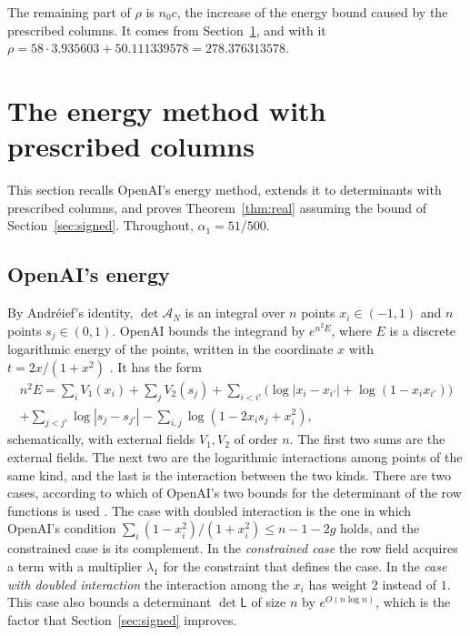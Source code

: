 \documentclass[11pt]{amsart}
\newcommand{\Rho}{278.376313578}
\newcommand{\Cost}{3.935603}
\newcommand{\Psiw}{50.111339578}
\newcommand{\AlphaOne}{51/500}
\theoremstyle{definition}
\theoremstyle{remark}
\numberwithin{equation}{section}
\newcommand{\cA}{\mathcal A}
\begin{document}
The remaining part of $\rho$ is $n_0c$, the increase of the energy bound caused by the prescribed
columns. It comes from Section~\ref{sec:energy}, and with it $\rho=58\cdot\Cost+\Psiw=\Rho$.
\section{The energy method with prescribed columns}\label{sec:energy}

This section recalls OpenAI's energy method, extends it to determinants with prescribed columns, and
proves Theorem~\ref{thm:real} assuming the bound of Section~\ref{sec:signed}. Throughout, $\alpha_1=\AlphaOne$.

\subsection{OpenAI's energy}\label{ssec:energy}
By Andr\'eief's identity, $\det\cA_N$ is an integral over $n$ points $x_i\in(-1,1)$ and $n$ points
$s_j\in(0,1)$. OpenAI bounds the integrand by $e^{n^2E}$, where $E$ is a discrete logarithmic energy of the
points, written in the coordinate $x$ with $t=2x/(1+x^2)$ \cite[\S5]{OpenAI2026}. It has the form
\begin{multline*}
 n^2E=\sum_iV_1(x_i)+\sum_jV_2(s_j)+\sum_{i<i'}\bigl(\log|x_i-x_{i'}|+\log(1-x_ix_{i'})\bigr)\\
 +\sum_{j<j'}\log|s_j-s_{j'}|-\sum_{i,j}\log(1-2x_is_j+x_i^2),
\end{multline*}
schematically, with external fields $V_1,V_2$ of order $n$. The first two sums are the
external fields. The next two are the logarithmic interactions among points of the same kind, and the last
is the interaction between the two kinds. There are two cases, according to which of OpenAI's two bounds for
the determinant of the row functions is used \cite[Props.~5.2, 5.3]{OpenAI2026}. The case with doubled interaction is the one in which OpenAI's condition
$\sum_i(1-x_i^2)/(1+x_i^2)\le n-1-2g$ \cite[Eq.~(67)]{OpenAI2026} holds, and the constrained case is its complement. In the \emph{constrained
case} the row field acquires a term with a multiplier $\lambda_1$ for the constraint that defines the case.
In the \emph{case with doubled interaction} the interaction among the $x_i$ has weight $2$ instead of $1$. This case also bounds a determinant
$\det\mathsf L$ of size $n$ by $e^{O(n\log n)}$, which is the factor that Section~\ref{sec:signed} improves.
\end{document}
